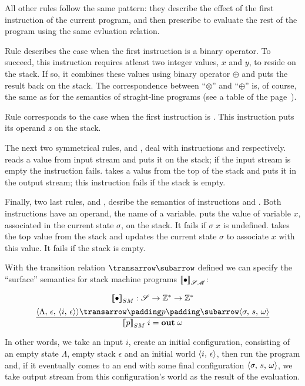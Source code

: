 All other rules follow the same pattern: they describe the effect of the first instruction of the current program,
and then prescribe to evaluate the rest of the program using the same evluation relation.

Rule  describes the case when the first instruction is a binary operator. To succeed, this instruction
requires atleast two integer values, $x$ and $y$, to reside on the stack. If so, it combines these values using binary
operator $\oplus$ and puts the result back on the stack. The correspondence between ``$\otimes$'' and ``$\oplus$'' is,
of course, the same as for the semantics of straght-line programs (see a table of the page~\pageref{times-plus-tab}).

Rule  corresponds to the case when the first instruction is . This instruction
puts its operand $z$ on the stack.

The next two symmetrical rules,  and , deal with instructions  and
 respectively.  reads a value from input stream and puts it on the stack; if the input stream is
empty the instruction fails.  takes a valus from the top of the stack and puts it in the output stream; this
instruction fails if the stack is empty.

Finally, two last rules,  and , desribe the semantics of instructions  and
. Both instructions have an operand, the name of a variable.  puts the value of variable $x$, associated
in the current state $\sigma$, on the stack. It fails if $\sigma\;x$ is undefined.  takes the top value from the
stack and updates the current state $\sigma$ to associate $x$ with this value. It fails if the stack is empty.

With the transition relation $\transrel$ defined we can specify the ``surface'' semantics for stack machine programs $\sembr{\bullet}^\ph_{\mathscr{SM}}$:

\[
  \begin{array}{c}
    \sembr{\bullet}^\ph_{SM} : \mathscr{S}\to \mathbb{Z}^*\to \mathbb{Z}^*\\[2mm]
      \trule{\trans{\inbr{\Lambda,\,\epsilon,\,\inbr{i,\,\epsilon}}}{p}{\inbr{\sigma,\,s,\,\omega}}}
            {\sembr{p}^\ph_{SM}\;i=\primi{out}{\;\omega}}
  \end{array}
\]

In other words, we take an input $i$, create an initial configuration, consisting of an empty state $\Lambda$, empty stack $\epsilon$ and an
initial world $\left<{i,\,\epsilon}\right>$, then run the program and, if it eventually comes to an end with some final configuration $\left<{\sigma,\,s,\,\omega}\right>$, we take
output stream from this configuration's world as the result of the evaluation.

